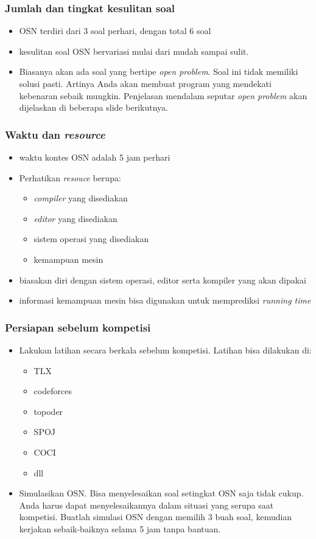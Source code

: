 \begin{frame}
	\frametitle{Jumlah dan tingkat kesulitan soal}
		
	\begin{itemize}
		\item OSN terdiri dari 3 soal perhari, dengan total 6 soal
		\item kesulitan soal OSN bervariasi mulai dari mudah sampai sulit.
		\item Biasanya akan ada soal yang bertipe \textit{open problem}. Soal ini tidak memiliki solusi pasti. Artinya Anda akan membuat program yang mendekati kebenaran sebaik mungkin. Penjelasan mendalam seputar \textit{open problem} akan dijelaskan di beberapa slide berikutnya.
	\end{itemize}
\end{frame}

\begin{frame}
	\frametitle{Waktu dan \textit{resource}}
	\begin{itemize}
		\item waktu kontes OSN adalah 5 jam perhari
		\item Perhatikan \textit{resouce} berupa:
		\begin{itemize}
			\item \textit{compiler} yang disediakan
			\item \textit{editor} yang disediakan
			\item sistem operasi yang disediakan
			\item kemampuan mesin
		\end{itemize}
		\item biasakan diri dengan sistem operasi, editor serta kompiler yang akan dipakai
		\item informasi kemampuan mesin bisa digunakan untuk memprediksi \textit{running time}
	\end{itemize}
\end{frame}

\begin{frame}
	\frametitle{Persiapan sebelum kompetisi}
	\begin{itemize}
		\item 	Lakukan latihan secara berkala sebelum kompetisi. Latihan bisa dilakukan di:
		\begin{itemize}
			\item TLX
			\item codeforces
			\item topoder
			\item SPOJ
			\item COCI
			\item dll
		\end{itemize}
		\item Simulasikan OSN. Bisa menyelesaikan soal setingkat OSN saja tidak cukup. Anda harus dapat menyelesaikannya dalam situasi yang serupa saat kompetisi. Buatlah simulasi OSN dengan memilih 3 buah soal, kemudian kerjakan sebaik-baiknya selama 5 jam tanpa bantuan.
	\end{itemize}
\end{frame}

